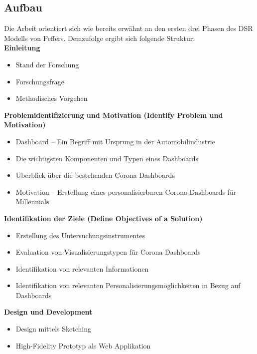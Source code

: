 \documentclass[12pt, oneside]{article}
\begin{document}
\clearpage
\subsection{Aufbau}
Die Arbeit orientiert sich wie bereits erwähnt an den ersten drei Phasen des DSR Modells von Peffers. Demzufolge ergibt sich folgende Struktur:\\

\textbf{Einleitung}
\begin{itemize}
    \item Stand der Forschung
    \item Forschungsfrage
    \item Methodisches Vorgehen\\
\end{itemize}


\textbf{Problemidentifizierung und Motivation (Identify Problem und Motivation)}
\begin{itemize}
    \item Dashboard – Ein Begriff mit Ursprung in der Automobilindustrie
    \item Die wichtigsten Komponenten und Typen eines Dashboards
    \item Überblick über die bestehenden Corona Dashboards
    \item Motivation – Erstellung eines personalisierbaren Corona Dashboards für Millennials\\
\end{itemize}

\textbf{Identifikation der Ziele (Define Objectives of a Solution)}
\begin{itemize}
    \item Erstellung des Untersuchungsinstrumentes
    \item Evaluation von Visualisierungstypen für Corona Dashboards
    \item Identifikation von relevanten Informationen
    \item Identifikation von relevanten Personalisierungsmöglichkeiten in Bezug auf Dashboards\\
\end{itemize}

\textbf{Design und Development}
\begin{itemize}
    \item Design mittels Sketching
    \item High-Fidelity Prototyp als Web Applikation\\
\end{itemize}
\end{document}
